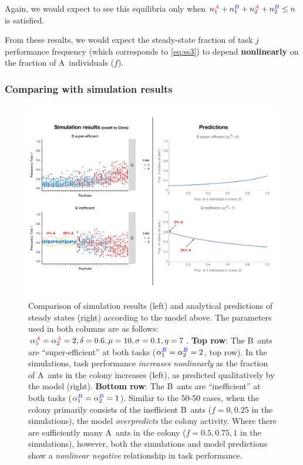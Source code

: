 \documentclass[10pt]{article}
\newcommand{\A}{{\color{red}A}}
\newcommand{\B}{{\color{blue}B}}
\begin{document}
Again, we would expect to see this equilibria only when $n_1^{\A} + n_1^{\B} + n_2^{\A}+ n_2^{\B} \leq n$ is satisfied.

From these results, we would expect the steady-state fraction of task $j$ performance frequency (which corresponds to \eqref{eq:ss3}) to depend \textbf{nonlinearly} on the fraction of \A\ individuals ($f$). \\

\subsubsection{Comparing with simulation results}
\begin{figure}[H]
    \centering
    \includegraphics[trim={0 1in 0 0.75in}, clip, width=0.9\linewidth]{output/Task_dist/mixes_comparison.pdf}
    \caption{Comparison of simulation results (left) and analytical predictions of steady states (right) according to the model above. The parameters used in both columns are as follows: $\alpha_1^{\A} = \alpha_2^{\A} = 2, \delta= 0.6, \mu=10, \sigma = 0.1, \eta = 7$. 
    \textbf{Top row}: The \B\ ants are ``super-efficient'' at both tasks ($\alpha_1^{\B} = \alpha_2^{\B} = 2$, top row). In the simulations, task performance \textit{increases nonlinearly} as the fraction of \A\ ants in the colony increases (left), as predicted qualitatively by the model (right).
    \textbf{Bottom row}: The \B\ ants are ``inefficient'' at both tasks ($\alpha_1^{\B} = \alpha_2^{\B} = 1$). 
    Similar to the 50-50 cases, when the colony primarily consists of the inefficient \B\ ants ($f = 0, 0.25$ in the simulations), the model \textit{overpredicts} the colony activity.
    Where there are sufficiently many \A\ ants in the colony ($f = 0.5, 0.75, 1$ in the simulations), however, both the simulations and model predictions show a \textit{nonlinear negative} relationship in task performance.}
    \label{fig:mixes_comp}
\end{figure}
\end{document}
